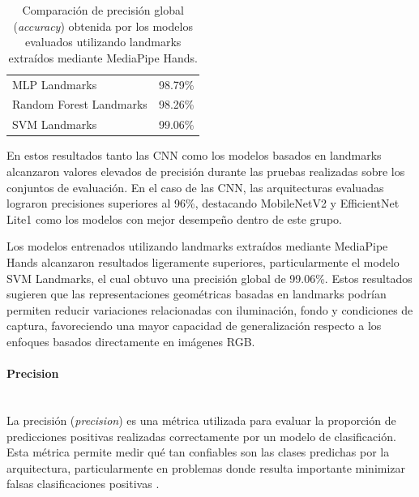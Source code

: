 	\begin{table}[H]
		\centering
		\caption{Comparación de precisión global (\textit{accuracy}) obtenida por los modelos evaluados utilizando landmarks extraídos mediante MediaPipe Hands.}
		\label{tab:landmarks_accuracy}
		
		\begin{tabular}{|p{4.2cm}|p{3.5cm}|}
			\hline
			\rowcolor{headerblue}
			\headercell{Modelo} &
			\headercell{Test Accuracy} \\
			\hline
			
			MLP Landmarks &
			98.79\% \\
			\hline
			
			Random Forest Landmarks &
			98.26\% \\
			\hline
			
			SVM Landmarks &
			99.06\% \\
			\hline
			
		\end{tabular}
	\end{table}
	
	
	En estos resultados tanto las CNN como los modelos basados en landmarks alcanzaron valores elevados de precisión  durante las pruebas realizadas sobre los conjuntos de evaluación. En el caso de las CNN, las arquitecturas evaluadas lograron precisiones superiores al 96\%, destacando MobileNetV2 y EfficientNet Lite1 como los modelos con mejor desempeño dentro de este grupo.
	
	Los modelos entrenados utilizando landmarks extraídos mediante MediaPipe Hands alcanzaron resultados ligeramente superiores, particularmente el modelo SVM Landmarks, el cual obtuvo una precisión global de 99.06\%. Estos resultados sugieren que las representaciones geométricas basadas en landmarks podrían permiten reducir variaciones relacionadas con iluminación, fondo y condiciones de captura, favoreciendo una mayor capacidad de generalización respecto a los enfoques basados directamente en imágenes RGB.
	
	\paragraph{Precision}\mbox{}\\

	La precisión (\textit{precision}) es una métrica utilizada para evaluar la proporción de predicciones positivas realizadas correctamente por un modelo de clasificación. Esta métrica permite medir qué tan confiables son las clases predichas por la arquitectura, particularmente en problemas donde resulta importante minimizar falsas clasificaciones positivas \cite{goodfellow2016deep,geron2022hands}.
	
